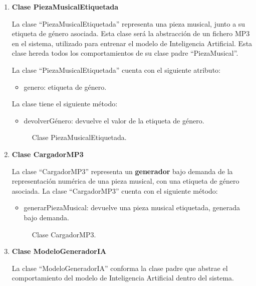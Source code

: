\begin{enumerate}
  \item \textbf{Clase PiezaMusicalEtiquetada}

  La clase ``PiezaMusicalEtiquetada'' representa una pieza musical, junto a su etiqueta de género asociada. Esta clase será la abstracción de un fichero MP3 en el sistema, utilizado para entrenar el modelo de Inteligencia Artificial. Esta clase hereda todos los comportamientos de su clase padre ``PiezaMusical''.

  La clase ``PiezaMusicalEtiquetada'' cuenta con el siguiente atributo:

  \begin{itemize}
      \item genero: etiqueta de género.
  \end{itemize}

  La clase tiene el siguiente método:

  \begin{itemize}
      \item devolverGénero: devuelve el valor de la etiqueta de género.
  \end{itemize}

  \begin{figure}[H]
    \centering
    
    \caption{Clase PiezaMusicalEtiquetada.}
  \end{figure}

  \item \textbf{Clase CargadorMP3}

  La clase ``CargadorMP3'' representa un \textbf{generador} bajo demanda de la representación numérica de una pieza musical, con una etiqueta de género asociada.
  La clase ``CargadorMP3'' cuenta con el siguiente método:

  \begin{itemize}
      \item generarPiezaMusical: devuelve una pieza musical etiquetada, generada bajo demanda.
  \end{itemize}

  \begin{figure}[H]
    \centering
    
    \caption{Clase CargadorMP3.}
  \end{figure}

  \item \textbf{Clase ModeloGeneradorIA}

  La clase ``ModeloGeneradorIA'' conforma la clase padre que abstrae el comportamiento del modelo de Inteligencia Artificial dentro del sistema.


\end{enumerate}
